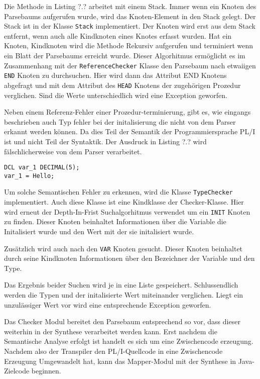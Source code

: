 Die Methode in Listing ?.? arbeitet mit einem Stack. Immer wenn ein Knoten des Parsebaums aufgerufen wurde, wird das Knoten-Element in den Stack gelegt. Der Stack ist in der Klasse \verb+Stack+ implementiert. Der Knoten wird erst aus dem Stack entfernt, wenn auch alle Kindknoten eines Knotes erfasst wurden. 
Hat ein Knoten, Kindknoten wird die Methode Rekursiv aufgerufen und terminiert wenn ein Blatt der Parsebaums erreicht wurde.
Dieser Algorhitmus ermöglicht es im Zusammenhang mit der \verb+ReferenceChecker+ Klasse den Parsebaum nach etwaiigen \verb+END+ Knoten zu durchsuchen.
Hier wird dann das Attribut END Knotens abgefragt und mit dem Attribut des \verb+HEAD+ Knotens der zugehörigen Prozedur verglichen. Sind die Werte unterschiedlich wird eine Exception geworfen.

Neben einem Referenz-Fehler einer Prozedur-terminierung, gibt es, wie eingangs beschrieben auch Typ fehler bei der initalisierung die nicht von dem Parser erkannt werden können.
Da dies Teil der Semantik der Programmiersprache PL/I ist und nicht Teil der Syntaktik.
Der Ausdruck in Listing ?.? wird fälschlicherweise von dem Parser verarbeitet.

\begin{verbatim}
DCL var_1 DECIMAL(5);
var_1 = Hello;
\end{verbatim}

Um solche Semantischen Fehler zu erkennen, wird die Klasse \verb+TypeChecker+ implementiert. 
Auch diese Klasse ist eine Kindklasse der Checker-Klasse. Hier wird erneut der Depth-In-Frist Suchalgorhitmus verwendet um ein \verb+INIT+ Knoten zu finden. Dieser Knoten beinhaltet Informationen über die Variable die Initalisiert wurde und den Wert mit der sie initalisiert wurde.
 
Zusätzlich wird auch nach den \verb+VAR+ Knoten gesucht. Dieser Knoten beinhaltet durch seine Kindknoten Informationen über den Bezeichner der Variable und den Type.

Das Ergebnis beider Suchen wird je in eine Liste gespeichert. Schlussendlich werden die Typen und der initalisierte Wert miteinander verglichen. Liegt ein unzulässiger Wert vor wird eine entsprechende Exception geworfen.

Das Checker Modul bereitet den Parsebaum entsprechend so vor, dass dieser weiterhin in der Synthese verarbeitet werden kann. Erst nachdem die Semantische Analyse erfolgt ist handelt es sich um eine Zwischencode erzeugung. 
Nachdem also der Transpiler den PL/I-Quellcode in eine Zwischencode Erzeugung Umgewandelt hat, kann das Mapper-Modul mit der Synthese in Java-Zielcode beginnen.
 
